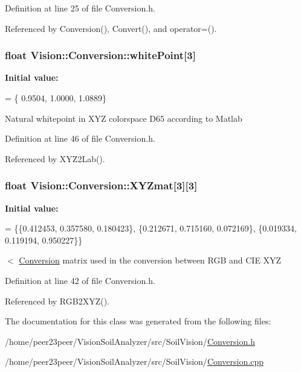 Definition at line 25 of file Conversion.\+h.



Referenced by Conversion(), Convert(), and operator=().

\hypertarget{class_vision_1_1_conversion_adbaed406827f7ffb583d003815a9f3f8}{}
\subsubsection[{white\+Point}]{\setlength{\rightskip}{0pt plus 5cm}float Vision\+::\+Conversion\+::white\+Point\mbox{[}3\mbox{]}\hspace{0.3cm}{\ttfamily [private]}}\label{class_vision_1_1_conversion_adbaed406827f7ffb583d003815a9f3f8}
{\bfseries Initial value\+:}
\begin{DoxyCode}
= \{
      0.9504, 1.0000, 1.0889\}
\end{DoxyCode}
Natural whitepoint in X\+Y\+Z colorspace D65 according to Matlab 

Definition at line 46 of file Conversion.\+h.



Referenced by X\+Y\+Z2\+Lab().

\hypertarget{class_vision_1_1_conversion_ad0c6e6c63380927c63da7f967b5e61d1}{}
\subsubsection[{X\+Y\+Zmat}]{\setlength{\rightskip}{0pt plus 5cm}float Vision\+::\+Conversion\+::\+X\+Y\+Zmat\mbox{[}3\mbox{]}\mbox{[}3\mbox{]}\hspace{0.3cm}{\ttfamily [private]}}\label{class_vision_1_1_conversion_ad0c6e6c63380927c63da7f967b5e61d1}
{\bfseries Initial value\+:}
\begin{DoxyCode}
= \{\{0.412453, 0.357580, 0.180423\},
                        \{0.212671, 0.715160, 0.072169\},
                        \{0.019334, 0.119194, 0.950227\}\}
\end{DoxyCode}
$<$ \hyperlink{class_vision_1_1_conversion}{Conversion} matrix used in the conversion between R\+G\+B and C\+I\+E X\+Y\+Z 

Definition at line 42 of file Conversion.\+h.



Referenced by R\+G\+B2\+X\+Y\+Z().



The documentation for this class was generated from the following files\+:\begin{DoxyCompactItemize}
\item 
/home/peer23peer/\+Vision\+Soil\+Analyzer/src/\+Soil\+Vision/\hyperlink{_conversion_8h}{Conversion.\+h}\item 
/home/peer23peer/\+Vision\+Soil\+Analyzer/src/\+Soil\+Vision/\hyperlink{_conversion_8cpp}{Conversion.\+cpp}\end{DoxyCompactItemize}
